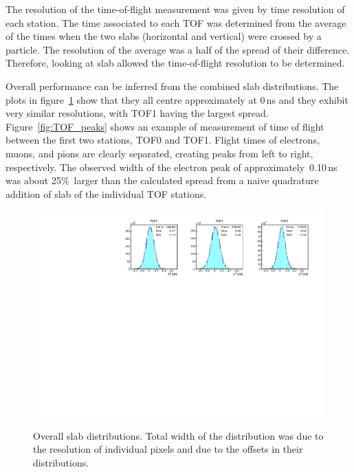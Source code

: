 The resolution of the time-of-flight measurement was given by time resolution
of each station.
The time associated to each TOF was determined from the average of the times when the two slabs (horizontal and vertical) were crossed by a particle.
The resolution of the average was a half of the spread of their difference. Therefore, looking at slab \DT{} allowed the time-of-flight
resolution to be determined.


Overall performance can be inferred from the combined slab \DT{}
distributions. The plots in figure~\ref{fig:SlabDtAll} show that they
all centre approximately at 0\,ns and they exhibit very similar
resolutions, with TOF1 having the largest spread.
Figure~\ref{fig:TOF_peaks} shows an example of measurement of time of
flight between the first two stations, TOF0 and TOF1. Flight times of electrons,
muons, and pions are clearly separated, creating peaks from left to
right, respectively. The observed width of the electron peak of
approximately~0.10\,ns was about 25\%~larger than the calculated spread from a
naive quadrature addition of slab \DT{} of the individual TOF stations.

\begin{figure}[htb!]
  \begin{center}
  \includegraphics[width=0.9\columnwidth]{07_overall_slab_dt} \\
  \caption{Overall slab \DT{} distributions. Total width of the
    distribution was due to the resolution of individual pixels and due to
    the offsets in their \DT{} distributions.}
  \label{fig:SlabDtAll}
  \end{center}
\end{figure}

